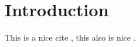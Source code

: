 \chapter{Introduction}


This is a nice cite \citep{Masset2000}, this also is nice \citet{Armitage2011a}.
